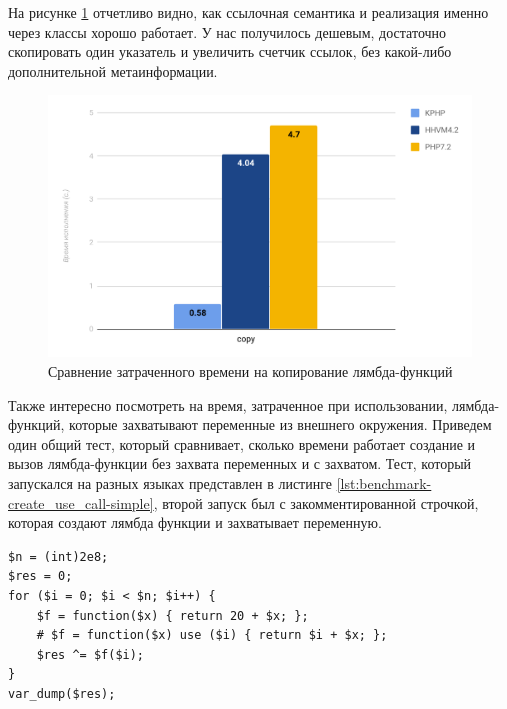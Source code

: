 На рисунке \ref{fig:benchmark-copy-simple} отчетливо видно, как ссылочная семантика и реализация именно через классы хорошо работает.
У нас получилось дешевым, достаточно скопировать один указатель и увеличить счетчик ссылок, без какой-либо дополнительной метаинформации.
\begin{figure}[H]
    \caption{Сравнение затраченного времени на копирование лямбда-функций}
    \label{fig:benchmark-copy-simple}
    \centering
    \includegraphics[width=\linewidth]{images/benchmark_copy_simple}
\end{figure}

Также интересно посмотреть на время, затраченное при использовании, лямбда-функций, которые захватывают переменные из внешнего окружения.
Приведем один общий тест, который сравнивает, сколько времени работает создание и вызов лямбда-функции без захвата переменных и с захватом.
Тест, который запускался на разных языках представлен в листинге \ref{lst:benchmark-create_use_call-simple}, второй запуск был с закомментированной строчкой, которая создают лямбда функции и захватывает переменную.
\begin{lstlisting}[caption={Бенчмарк создания и вызова анонимных функций с захватом},label={lst:benchmark-create_use_call-simple}]
$n = (int)2e8;
$res = 0;
for ($i = 0; $i < $n; $i++) {
    $f = function($x) { return 20 + $x; };
    # $f = function($x) use ($i) { return $i + $x; };
    $res ^= $f($i);
}
var_dump($res);
\end{lstlisting}

